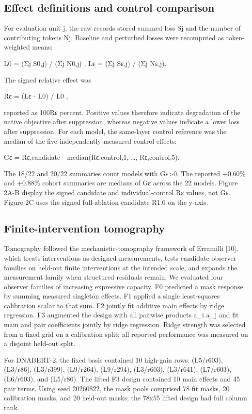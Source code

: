 \documentclass[11pt]{article}
\begin{document}
\subsection*{Effect definitions and control comparison}
For evaluation unit j, the raw records stored summed loss Sj and the number of contributing tokens Nj. Baseline and perturbed losses were recomputed as token-weighted means:

L0 = (Σj S0,j) / (Σj N0,j) ,        Lε = (Σj Sε,j) / (Σj Nε,j).

The signed relative effect was

Rε = (Lε - L0) / L0 ,

reported as 100Rε percent. Positive values therefore indicate degradation of the native objective after suppression, whereas negative values indicate a lower loss after suppression. For each model, the same-layer control reference was the median of the five independently measured control effects:

Gε = Rε,candidate - median(Rε,control,1, …, Rε,control,5).

The 18/22 and 20/22 summaries count models with Gε>0. The reported +0.60\% and +0.88\% cohort summaries are medians of Gε across the 22 models. Figure 2A-B display the signed candidate and individual-control Rε values, not Gε. Figure 2C uses the signed full-ablation candidate R1.0 on the y-axis.

\subsection*{Finite-intervention tomography}
Tomography followed the mechanistic-tomography framework of Erramilli [10], which treats interventions as designed measurements, tests candidate observer families on held-out finite interventions at the intended scale, and expands the measurement family when structured residuals remain. We evaluated four observer families of increasing expressive capacity. F0 predicted a mask response by summing measured singleton effects. F1 applied a single least-squares calibration scalar to that sum. F2 jointly fit additive main effects by ridge regression. F3 augmented the design with all pairwise products a\_i a\_j and fit main and pair coefficients jointly by ridge regression. Ridge strength was selected from a fixed grid on a calibration split; all reported performance was measured on a disjoint held-out split.

For DNABERT-2, the fixed basis contained 10 high-gain rows: (L5/r603), (L3/r86), (L3/r399), (L9/r264), (L9/r294), (L3/r603), (L3/r641), (L7/r603), (L6/r603), and (L5/r86). The lifted F3 design contained 10 main effects and 45 pair terms. Using seed 20260822, the mask pools comprised 78 fit masks, 20 calibration masks, and 20 held-out masks; the 78x55 lifted design had full column rank.
\end{document}
